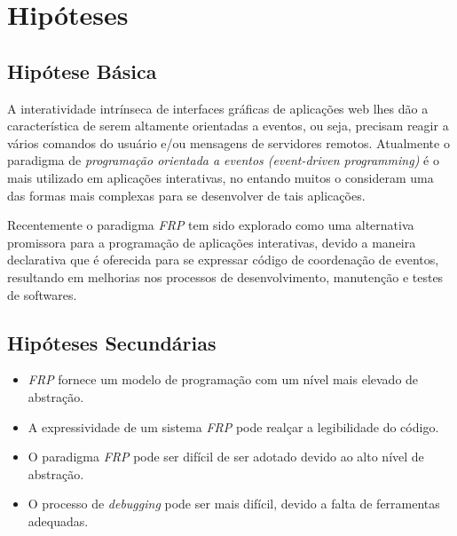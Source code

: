 \section{Hipóteses}\label{lhipoteses}


\subsection{Hipótese Básica}

A interatividade intrínseca de interfaces gráficas de
aplicações web lhes dão a característica de serem altamente
orientadas a eventos,
ou seja, precisam reagir a vários comandos do usuário e/ou
mensagens de servidores remotos.
Atualmente o paradigma de \emph{programação orientada a
eventos (event-driven programming)} é o mais utilizado em
aplicações interativas, no entando muitos o consideram uma
das formas mais complexas para se desenvolver de tais aplicações.

Recentemente o paradigma \emph{FRP} tem sido explorado como
uma alternativa promissora para a programação de aplicações
interativas, devido a maneira declarativa que é oferecida
para se expressar código de coordenação de eventos,
resultando em melhorias nos processos de desenvolvimento,
manutenção e testes de softwares.


\subsection{Hipóteses Secundárias}

\begin{itemize}[noitemsep]
  \item \emph{FRP} fornece um modelo de programação com um
        nível mais elevado de abstração.
  \item A expressividade de um sistema \emph{FRP} pode
        realçar a legibilidade do código.
  \item O paradigma \emph{FRP} pode ser difícil de ser adotado
        devido ao alto nível de abstração.
  \item O processo de \emph{debugging} pode ser mais difícil,
        devido a falta de ferramentas adequadas.
\end{itemize}

